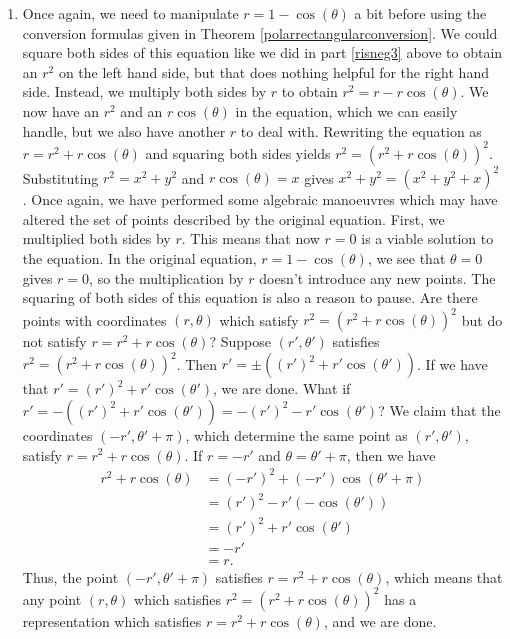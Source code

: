 {\begin{enumerate}
\item  Once again, we need to manipulate   $r = 1 - \cos(\theta)$ a bit before using the conversion formulas given in Theorem \ref{polarrectangularconversion}.  We could square both sides of this equation like we did in part \ref{risneg3} above to obtain an $r^2$ on the left hand side, but that does nothing helpful for the right hand side.  Instead, we multiply both sides by $r$ to obtain  $r^{2} = r - r\cos(\theta)$.  We now have an $r^2$ and an $r\cos(\theta)$ in the equation, which we can easily handle, but we also have another $r$ to deal with.  Rewriting the equation as $r = r^{2} + r\cos(\theta)$ and squaring both sides yields $r^2 = \left(r^2 + r\cos(\theta)\right)^2$.  Substituting $r^2 = x^2 + y^2$ and $r\cos(\theta) = x$ gives   $x^2 + y^2 = \left(x^2 + y^2 + x\right)^2$.  Once again, we have performed some algebraic manoeuvres which may have altered the set of points described by the original equation.  First, we multiplied both sides by $r$.  This means that now $r=0$ is a viable solution to the equation.  In the original equation, $r = 1 - \cos(\theta)$, we see that $\theta = 0$ gives $r=0$, so the multiplication by $r$ doesn't introduce any new points. The squaring of both sides of this equation is also a reason to pause.  Are there points with coordinates $(r,\theta)$ which satisfy $r^2 = \left(r^2 + r\cos(\theta)\right)^2$ but do not satisfy $r = r^2 + r\cos(\theta)$?  Suppose $\left(r',\theta'\right)$ satisfies $r^2 = \left(r^2 + r\cos(\theta)\right)^2$.  Then $r' = \pm \left((r')^2 + r'\cos(\theta')\right)$.  If we have that $r' = (r')^2 + r'\cos(\theta')$, we are done.  What if $r' = -\left((r')^2 + r'\cos(\theta')\right) = -(r')^{2} - r'\cos(\theta')$?  We claim that the coordinates $(-r', \theta' + \pi)$, which determine the same point as $(r',\theta')$, satisfy $r = r^2 + r\cos(\theta)$. If $r =  -r'$ and $\theta = \theta' + \pi$, then we have
\begin{align*}
r^2+r\cos(\theta) & = (-r')^2+(-r')\cos(\theta'+\pi)\\
& = (r')^2-r'(-\cos(\theta')) \tag*{Since $\cos(\theta'+\pi)=-\cos(\theta')$}\\
& = (r')^2+r'\cos(\theta')\\
& = -r' \tag*{Since $r' = -(r')^2-r'\cos(\theta')$}\\
& = r.
\end{align*}
Thus, the point $(-r', \theta' + \pi)$ satisfies $r = r^2 + r\cos(\theta)$, which means that any point $(r,\theta)$ which satisfies $r^2 = \left(r^2 + r\cos(\theta)\right)^2$ has a representation which satisfies  $r = r^2 + r\cos(\theta)$, and we are done. 

\end{enumerate}
}

